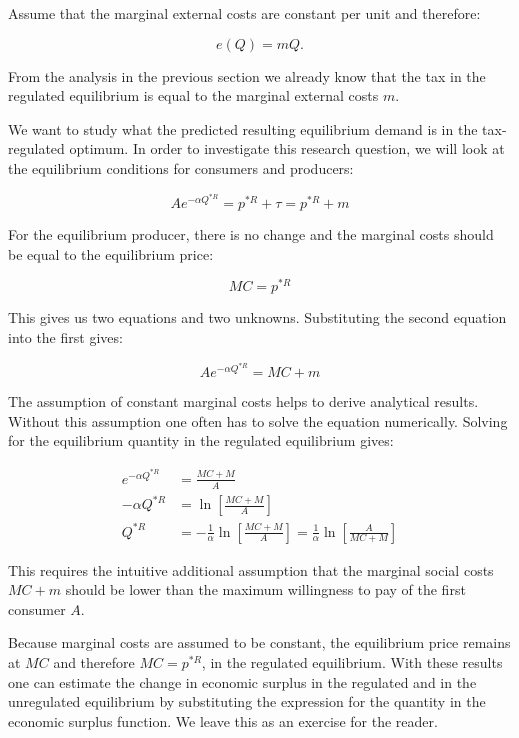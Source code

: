 \documentclass[
]{book}
\begin{document}
Assume that the marginal external costs are constant per unit and therefore:

\begin{equation}
e(Q)=mQ.
\end{equation}

From the analysis in the previous section we already know that the tax in the regulated equilibrium is equal to the marginal external costs \(m\).

We want to study what the predicted resulting equilibrium demand is in the tax-regulated optimum. In order to investigate this research question, we will look at the equilibrium conditions for consumers and producers:

\begin{equation}
A e^{-\alpha Q^{* R}} = p^{* R} + \tau = p^{* R} + m
\end{equation}

For the equilibrium producer, there is no change and the marginal costs should be equal to the equilibrium price:

\begin{equation}
MC = p^{* R}
\end{equation}

This gives us two equations and two unknowns. Substituting the second equation into the first gives:

\begin{equation}
A e^{-\alpha Q^{* R}}  = MC + m
\end{equation}

The assumption of constant marginal costs helps to derive analytical results. Without this assumption one often has to solve the equation numerically. Solving for the equilibrium quantity in the regulated equilibrium gives:

\begin{align}
e^{-\alpha Q^{* R}} &= \frac{MC + M}{A} \\
- \alpha Q^{* R} &=\ln \left[\frac{MC + M}{A} \right] \\
Q^{* R} &= -\frac{1}{\alpha}\ln \left[\frac{MC + M}{A} \right]= \frac{1}{\alpha}\ln \left[\frac{A}{MC + M}\right]
\end{align}

This requires the intuitive additional assumption that the marginal social costs \(MC+m\) should be lower than the maximum willingness to pay of the first consumer \(A\).

Because marginal costs are assumed to be constant, the equilibrium price remains at \(MC\) and therefore \(MC=p^{* R}\), in the regulated equilibrium. With these results one can estimate the change in economic surplus in the regulated and in the unregulated equilibrium by substituting the expression for the quantity in the economic surplus function. We leave this as an exercise for the reader.
\end{document}
